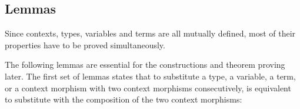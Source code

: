 \documentclass{acm_proc_article-sp}
\begin{document}
{\begin{code}
\>[48]\<%
\\
\>[0]\<[8]%
\>[8]        \<[25]%
\>[25]\<%
\\
\>[0]\<[8]%
\>[8]  \AgdaSymbol{\{\_\}} \AgdaSymbol{\{}  \AgdaSymbol{(} \AgdaInductiveConstructor{,} \AgdaSymbol{)\}} \AgdaSymbol{(} \AgdaInductiveConstructor{,} \AgdaSymbol{)} \AgdaSymbol{(} \AgdaInductiveConstructor{,} \AgdaSymbol{)}\<%
\\
\>  \AgdaSymbol{(} \AgdaSymbol{\_)} \AgdaSymbol{=} \<%
\\
%
\\
\>\<\end{code}
}


\subsection{Lemmas}

Since contexts, types, variables and
terms are all mutually defined, most of their properties have to
be proved simultaneously.

The following lemmas are essential for the constructions and theorem
proving later.  The first set of lemmas states that to substitute a
type, a variable, a term, or a context morphism with two context
morphisms consecutively, is equivalent to substitute with the
composition of the two context morphisms:
\end{document}
